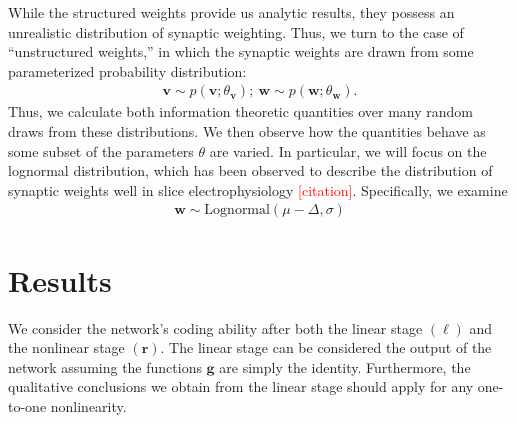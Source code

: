 \documentclass[12pt]{article}
\begin{document}
While the structured weights provide us analytic results, they possess an unrealistic distribution of synaptic weighting. Thus, we turn to the case of ``unstructured weights,'' in which the synaptic weights are drawn from some parameterized probability distribution:
\begin{align}
\mathbf{v} \sim p(\mathbf{v}; \theta_{\mathbf{v}}); \ \mathbf{w} \sim p(\mathbf{w}; \theta_{\mathbf{w}}).
\end{align}
Thus, we  calculate both information theoretic quantities over many random draws from these distributions. We then observe how the quantities behave as some subset of the parameters $\theta$ are varied. In particular, we will focus on the lognormal distribution, which has been observed to describe the distribution of synaptic weights well in slice electrophysiology \textcolor{red}{[citation]}. Specifically, we examine 
\begin{align}
\mathbf{w}\sim \text{Lognormal}(\mu - \Delta, \sigma)
\end{align}
\section{Results}
We consider the network's coding ability after both the linear stage $(\boldsymbol{\ell})$ and the nonlinear stage $(\mathbf{r})$. The linear stage can be considered the output of the network assuming the functions $\mathbf{g}$ are simply the identity. Furthermore, the qualitative conclusions we obtain from the linear stage should apply for any one-to-one nonlinearity. 
	
\end{document}
